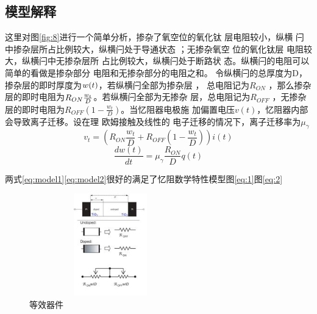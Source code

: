 \documentclass[UTF8]{article}
\begin{document}
\subsection{模型解释}
这里对图\eqref{fig:8}进行一个简单分析，掺杂了氧空位的氧化钛 层电阻较小，纵横 闩中掺杂层所占比例较大，纵横闩处于导通状态 ；无掺杂氧空 位的氧化钛层 电阻较大，纵横闩中无掺杂层所 占比例较大，纵横闩处于断路状 态。纵横闩的电阻可以简单的看做是掺杂部分 电阻和无掺杂部分的电阻之和。 令纵横闩的总厚度为D，掺杂层的即时厚度为$\mathnormal{w(t)}   $，若纵横闩全部为掺杂层 ， 总电阻记为$R_{ON}$ ，那么掺杂层的即时电阻为$R_{ON} \frac{\mathnormal{w_{t}}}{\mathnormal{D}}$。若纵横闩全部为无掺杂 层，总电阻记为$R_{OFF}$ ，无掺杂层的即时电阻为$R_{OFF}(1 - \frac{w_{t}}{D})$。当忆阻器电极施 加偏置电压$v(t)$，忆阻器内部会导致离子迁移。设在理 欧姆接触及线性的 电子迁移的情况下，离子迁移率为$\mu_{\gamma}$
\begin{equation}\label{eq:model1}
v_{t} = (R_{ON} \frac{w_{t}}{D} + R_{OFF}(1 - \frac{w_{t}}{D}) ) i(t)
\end{equation}
\begin{equation}\label{eq:model2}
\frac{dw(t)}{dt} = \mu_{\gamma}\frac{R_{ON}}{D}q(t)
\end{equation}

两式\eqref{eq:model1}\eqref{eq:model2}很好的满足了忆阻数学特性模型图\eqref{eq:1}图\eqref{eq:2}


\begin{figure}[htbp]
\centering
\includegraphics[width=2.77in,height=1.75in]{pic/no2.jpeg}

\caption{等效器件}
\label{fig:graph}
\end{figure}




\end{document}
